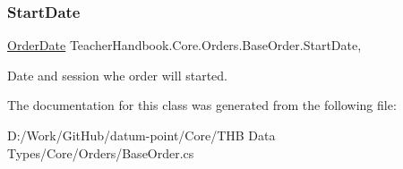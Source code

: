 \subsubsection{\texorpdfstring{Start\+Date}{StartDate}}
{\footnotesize\ttfamily \mbox{\hyperlink{struct_teacher_handbook_1_1_core_1_1_orders_1_1_order_date}{Order\+Date}} Teacher\+Handbook.\+Core.\+Orders.\+Base\+Order.\+Start\+Date\hspace{0.3cm}{\ttfamily [get]}, {\ttfamily [set]}}



Date and session whe order will started. 



The documentation for this class was generated from the following file\+:\begin{DoxyCompactItemize}
\item 
D\+:/\+Work/\+Git\+Hub/datum-\/point/\+Core/\+T\+H\+B Data Types/\+Core/\+Orders/Base\+Order.\+cs\end{DoxyCompactItemize}
